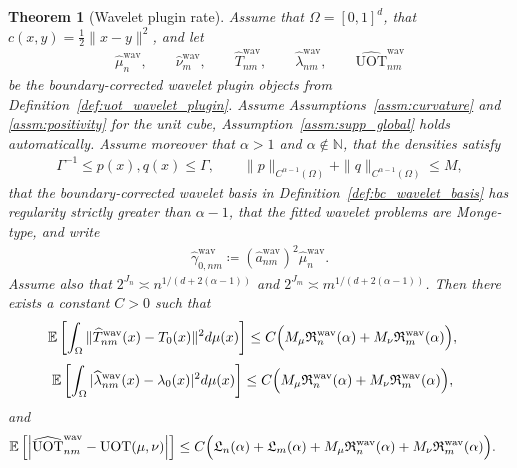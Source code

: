 \documentclass[11pt,reqno]{amsart}
\newtheorem{theorem}{Theorem}
\theoremstyle{definition}
\renewcommand{\hat}{\widehat}
\newcommand{\Ep}{\mathbb{E}}
\begin{document}
\begin{theorem}[Wavelet plugin rate]
\label{thm:main_wavelet_rates}
Assume that $\Omega=[0,1]^d$, that $c(x,y)=\tfrac{1}{2}\|x-y\|^2$, and let
\begin{align*}
    \hat\mu_n^{\mathrm{wav}},\qquad \hat\nu_m^{\mathrm{wav}},\qquad \hat T_{nm}^{\mathrm{wav}},\qquad \hat\lambda_{nm}^{\mathrm{wav}},\qquad \widehat{\mathrm{UOT}}_{nm}^{\mathrm{wav}}
\end{align*}
be the boundary-corrected wavelet plugin objects from Definition~\ref{def:uot_wavelet_plugin}.
{Assume Assumptions~\ref{assm:curvature} and \ref{assm:positivity}} for the unit cube, Assumption~\ref{assm:supp_global} holds automatically.
Assume moreover that $\alpha>1$ and $\alpha\notin\mathbb N$, that the densities satisfy
\begin{align}
    \Gamma^{-1} \le p(x),q(x) \le \Gamma,
    \qquad
    \|p\|_{C^{\alpha-1}(\Omega)}+\|q\|_{C^{\alpha-1}(\Omega)} \le M,
\end{align}
that the boundary-corrected wavelet basis in Definition~\ref{def:bc_wavelet_basis} has regularity strictly greater than $\alpha-1$, that the fitted wavelet problems are Monge-type, and write
\begin{align*}
    \hat\gamma_{0,nm}^{\mathrm{wav}}
    \coloneqq
    (\hat a_{nm}^{\mathrm{wav}})^2\hat\mu_n^{\mathrm{wav}}.
\end{align*}
Assume also that
    $2^{J_n} \asymp n^{{1} / ({d+2(\alpha-1)})}$ and
    $2^{J_m} \asymp m^{{1} / ({d+2(\alpha-1)})}$.
Then there exists a constant $C>0$ such that
\begin{align}
    \Ep\left[
        \int_{\Omega}
        \|\hat T_{nm}^{\mathrm{wav}}(x)-T_0(x)\|^2   d\mu(x)
    \right]
    &\le
    C\Bigl(M_\mu \mathfrak R_n^{\mathrm{wav}}(\alpha) + M_\nu \mathfrak R_m^{\mathrm{wav}}(\alpha)\Bigr),
\end{align}
\begin{align}
    \Ep\left[
        \int_{\Omega}
        |\hat\lambda_{nm}^{\mathrm{wav}}(x)-\lambda_0(x)|^2   d\mu(x)
    \right]
    &\le
    C\Bigl(M_\mu \mathfrak R_n^{\mathrm{wav}}(\alpha) + M_\nu \mathfrak R_m^{\mathrm{wav}}(\alpha)\Bigr),
\end{align}
and
\begin{align}
\begin{aligned}
    \Ep\left[
        \left|
            \widehat{\mathrm{UOT}}_{nm}^{\mathrm{wav}} - \mathrm{UOT}(\mu,\nu)
        \right|
    \right]
    &\le
    C\Bigl(
        \mathfrak L_n(\alpha)+\mathfrak L_m(\alpha) + M_\mu \mathfrak R_n^{\mathrm{wav}}(\alpha)+M_\nu \mathfrak R_m^{\mathrm{wav}}(\alpha)
    \Bigr).
\end{aligned}
\end{align}
\end{theorem}
\end{document}
